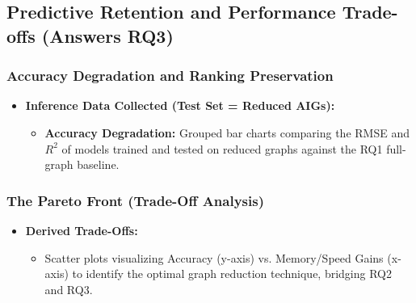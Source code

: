 \documentclass[paper=a4, fontsize=11pt]{scrartcl} %
\numberwithin{equation}{section} %
\numberwithin{figure}{section} %
\numberwithin{table}{section} %
\begin{document}
\subsection{Predictive Retention and Performance Trade-offs (Answers RQ3)}

\subsubsection{Accuracy Degradation and Ranking Preservation}
\begin{itemize}
    \item \textbf{Inference Data Collected (Test Set = Reduced AIGs):}
    \begin{itemize}
        \item \textbf{Accuracy Degradation:} Grouped bar charts comparing the RMSE and $R^2$ of models trained and tested on reduced graphs against the RQ1 full-graph baseline.
    \end{itemize}
\end{itemize}

\subsubsection{The Pareto Front (Trade-Off Analysis)}
\begin{itemize}
    \item \textbf{Derived Trade-Offs:}
    \begin{itemize}
        \item Scatter plots visualizing Accuracy (y-axis) vs. Memory/Speed Gains (x-axis) to identify the optimal graph reduction technique, bridging RQ2 and RQ3.
    \end{itemize}
\end{itemize}
\end{document}
